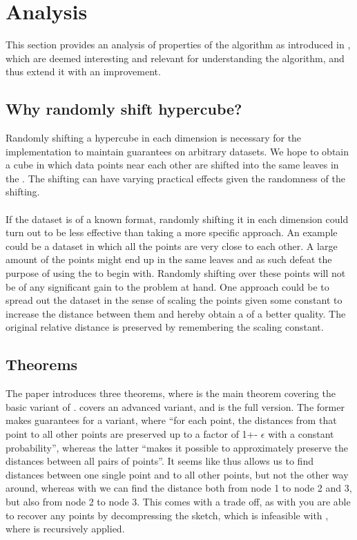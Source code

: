 \section{Analysis}
\label{analysis}
This section provides an analysis of properties of the \qs{} algorithm as introduced in \cite{wagner17}, which are deemed interesting and relevant for understanding the algorithm, and thus extend it with an improvement.

\subsection{Why randomly shift hypercube?}
Randomly shifting a hypercube in each dimension is necessary for the \qs{} implementation to maintain guarantees on arbitrary datasets. We hope to obtain a cube in which data points near each other are shifted into the same leaves in the \qt{}. The shifting can have varying practical effects given the randomness of the shifting.
\\
\\
If the dataset is of a known format, randomly shifting it in each dimension could turn out to be less effective than taking a more specific approach. An example could be a dataset in which all the points are very close to each other. A large amount of the points might end up in the same leaves and as such defeat the purpose of using the \qt{} to begin with. Randomly shifting over these points will not be of any significant gain to the problem at hand. One approach could be to spread out the dataset in the sense of scaling the points given some constant to increase the distance between them and hereby obtain a \qt{} of a better quality. The original relative distance is preserved by remembering the scaling constant.

\subsection{Theorems}
The paper introduces three theorems, where  is the main theorem covering the basic variant of \qs{}.  covers an advanced variant, and  is the full version. The former makes guarantees for a \qs{} variant, where “for each point, the distances from that point to all other points are preserved up to a factor of 1+- $\epsilon$ with a constant probability”, whereas the latter “makes it possible to approximately preserve the distances between all pairs of points”. It seems like  thus allows us to find distances between one single point and to all other points, but not the other way around, whereas with  we can find the distance both from node 1 to node 2 and 3, but also from node 2 to node 3. This comes with a trade off, as with  you are able to recover any points by decompressing the sketch, which is infeasible with , where \qs{} is recursively applied.

